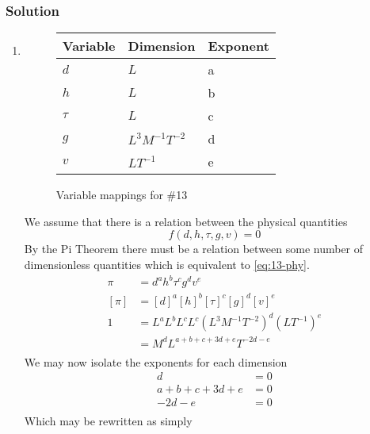 \documentclass[12pt]{article}
\begin{document}
  \subsubsection*{Solution}
  \begin{enumerate}
  \item
    \begin{figure}
      \centering
      \begin{tabularx}{0.5\textwidth}{XXX}
        Variable & Dimension & Exponent \\ \midrule
        $d$ & $L$ & a \\
        $h$ & $L$ & b \\
        $\tau$ & $L$ & c \\
        $g$ & $L^3M^{-1}T^{-2}$ & d \\
        $v$ & $LT^{-1}$ & e \\
      \end{tabularx}
      \caption{Variable mappings for \#13}
\label{fig:13-var-mappings}
    \end{figure}
    We assume that there is a relation between the physical quantities
    \begin{equation}
      \label{eq:13-phy}
      f(d,h,\tau,g,v) = 0
    \end{equation}
    By the Pi Theorem there must be a relation between some number of
    dimensionless quantities which is equivalent to \cref{eq:13-phy}.
    \begin{equation*}
      \begin{aligned}
        \pi &= {d}^a {h}^b {\tau}^c {g}^d {v}^e \\
        [\pi] &= {[d]}^a {[h]}^b {[\tau]}^c {[g]}^d {[v]}^e \\
        1 &= L^{a}L^{b}L^{c}L^{c}{(L^3M^{-1}T^{-2})}^{d}{(LT^{-1})}^{e} \\
        &= M^{d}L^{a+b+c+3d+e}T^{-2d-e} \\
      \end{aligned}
    \end{equation*}
    We may now isolate the exponents for each dimension
    \begin{equation*}
      \begin{aligned}
        d &= 0 \\
        a + b + c + 3d + e &= 0 \\
        -2d - e &= 0 \\
      \end{aligned}
    \end{equation*}
    Which may be rewritten as simply

\end{enumerate}
\end{document}
